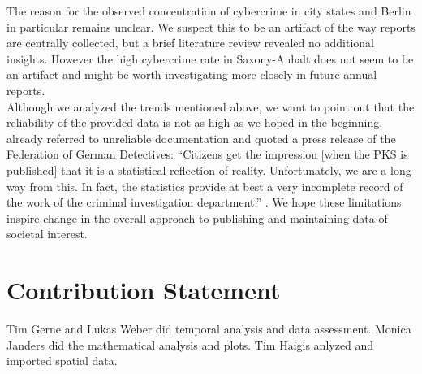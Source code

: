 \documentclass{article}
\theoremstyle{plain}
\theoremstyle{definition}
\theoremstyle{remark}
\begin{document}
The reason for the observed concentration of cybercrime in city states and Berlin in particular remains unclear. We suspect this to be an artifact of the way reports are centrally collected, but a brief literature review revealed no additional insights.
However the high cybercrime rate in Saxony-Anhalt does not seem to be an artifact and might be worth investigating more closely in future annual reports.\\
Although we analyzed the trends mentioned above, we want to point out that the reliability of the provided data is not as high as we hoped in the beginning. \citet{köppen2015cybercrime} already referred to unreliable documentation and quoted a press release of the Federation of German Detectives: \textquotedblleft{}Citizens get the impression [when the PKS is published] that it is a statistical reflection of reality. Unfortunately, we are a long way from this. In fact, the statistics provide at best a very incomplete record of the work of the criminal investigation department.\textquotedblright{} .
We hope these limitations inspire change in the overall approach to publishing and maintaining data of societal interest.

\section*{Contribution Statement}

Tim Gerne and Lukas Weber did temporal analysis and data assessment. 
Monica Janders did the mathematical analysis and plots.
Tim Haigis anlyzed and imported spatial data.



\end{document}
